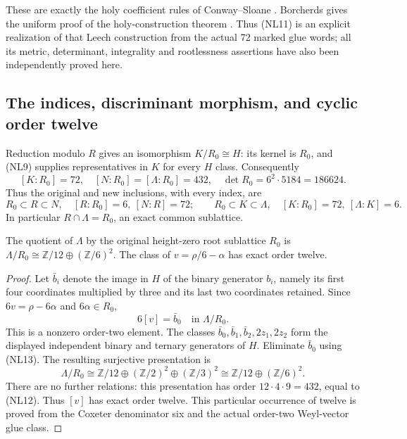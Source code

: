 These are exactly the holy coefficient rules of Conway--Sloane
\cite[pp.~277--280]{esn:ConwaySloane1982}.
Borcherds gives the uniform proof of the holy-construction
theorem \cite[Section~7, especially the coefficient rules
(i)--(ii) and Lemma~7.3]{esn:Borcherds1985}.
Thus (NL11) is an explicit realization of that Leech
construction from the actual 72 marked glue words; all its
metric, determinant, integrality and rootlessness assertions
have also been independently proved here.

\subsection{The indices, discriminant morphism, and cyclic order twelve}

Reduction modulo $R$ gives an isomorphism $K/R_0\cong H$:
its kernel is $R_0$, and (NL9) supplies representatives in $K$
for every $H$ class. Consequently
\[
 [K:R_0]=72,\quad [N:R_0]=[\Lambda:R_0]=432,\quad
 \det R_0=6^2\cdot5184=186624.
 \tag{NL12}
\]
Thus the original and new inclusions, with every index, are
\[
 R_0\subset R\subset N,\quad [R:R_0]=6,\ [N:R]=72;
 \qquad
 R_0\subset K\subset\Lambda,\quad[K:R_0]=72,\ [\Lambda:K]=6.
\]
In particular $R\cap\Lambda=R_0$, an exact common sublattice.

\begin{theorem}
\label{esnl:thm:cyclic-twelve}
The quotient of $\Lambda$ by the original height-zero root
sublattice $R_0$ is
$\Lambda/R_0\cong\mathbb Z/12\oplus(\mathbb Z/6)^2$.
The class of $v=\rho/6-\alpha$ has exact order twelve.
\end{theorem}

\begin{proof}
Let $\bar b_i$ denote the image in $H$ of the binary generator
$b_i$, namely its first four coordinates multiplied by three
and its last two coordinates retained.
Since $6v=\rho-6\alpha$ and $6\alpha\in R_0$,
\[
 6[v]=\bar b_0\quad\text{in }\Lambda/R_0.
 \tag{NL13}
\]
This is a nonzero order-two element. The classes
$\bar b_0,\bar b_1,\bar b_2,2z_1,2z_2$ form the displayed
independent binary and ternary generators of $H$.
Eliminate $\bar b_0$ using (NL13). The resulting surjective
presentation is
\[
 \Lambda/R_0\cong
 \mathbb Z/12\oplus(\mathbb Z/2)^2\oplus(\mathbb Z/3)^2
 \cong\mathbb Z/12\oplus(\mathbb Z/6)^2.
 \tag{NL14}
\]
There are no further relations: this presentation has order
$12\cdot4\cdot9=432$, equal to (NL12).
Thus $[v]$ has exact order twelve. This particular occurrence
of twelve is proved from the Coxeter denominator six and the
actual order-two Weyl-vector glue class.
\end{proof}

